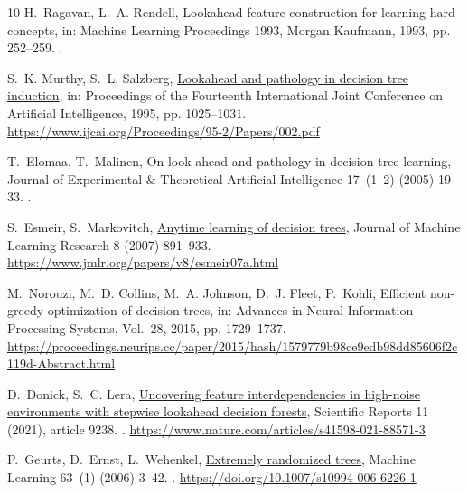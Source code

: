 \documentclass[final,5p,times]{elsarticle}
\begin{document}
\begin{thebibliography}{10}
H.~Ragavan, L.~A. Rendell, Lookahead feature construction for learning hard
  concepts, in: Machine Learning Proceedings 1993, Morgan Kaufmann, 1993, pp.
  252--259.
\newblock \href {https://doi.org/10.1016/B978-1-55860-307-3.50039-3}
  {}.

S.~K. Murthy, S.~L. Salzberg,
  \href{https://www.ijcai.org/Proceedings/95-2/Papers/002.pdf}{Lookahead and
  pathology in decision tree induction}, in: Proceedings of the Fourteenth
  International Joint Conference on Artificial Intelligence, 1995, pp.
  1025--1031.
\newline\urlprefix\url{https://www.ijcai.org/Proceedings/95-2/Papers/002.pdf}

T.~Elomaa, T.~Malinen, On look-ahead and pathology in decision tree learning,
  Journal of Experimental \& Theoretical Artificial Intelligence 17~(1--2)
  (2005) 19--33.
\newblock \href {https://doi.org/10.1080/09528130512331315936}
  {}.

S.~Esmeir, S.~Markovitch,
  \href{https://www.jmlr.org/papers/v8/esmeir07a.html}{Anytime learning of
  decision trees}, Journal of Machine Learning Research 8 (2007) 891--933.
\newline\urlprefix\url{https://www.jmlr.org/papers/v8/esmeir07a.html}

M.~Norouzi, M.~D. Collins, M.~A. Johnson, D.~J. Fleet, P.~Kohli, Efficient
  non-greedy optimization of decision trees, in: Advances in Neural Information
  Processing Systems, Vol.~28, 2015, pp. 1729--1737.
\newline\urlprefix\url{https://proceedings.neurips.cc/paper/2015/hash/1579779b98ce9edb98dd85606f2c119d-Abstract.html}

D.~Donick, S.~C. Lera,
  \href{https://www.nature.com/articles/s41598-021-88571-3}{Uncovering feature
  interdependencies in high-noise environments with stepwise lookahead decision
  forests}, Scientific Reports 11 (2021), article 9238.
\newblock \href {https://doi.org/10.1038/s41598-021-88571-3}
  {}.
\newline\urlprefix\url{https://www.nature.com/articles/s41598-021-88571-3}

P.~Geurts, D.~Ernst, L.~Wehenkel,
  \href{https://doi.org/10.1007/s10994-006-6226-1}{Extremely randomized trees},
  Machine Learning 63~(1) (2006) 3--42.
\newblock \href {https://doi.org/10.1007/s10994-006-6226-1}
  {}.
\newline\urlprefix\url{https://doi.org/10.1007/s10994-006-6226-1}


\end{thebibliography}
\end{document}
